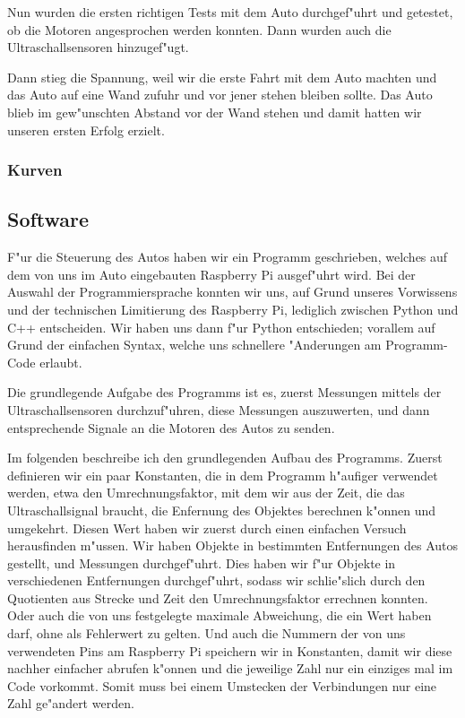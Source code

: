 \documentclass[a4paper,12pt]{article}
\begin{document}
Nun wurden die ersten richtigen Tests mit dem Auto durchgef"uhrt und getestet, ob die Motoren angesprochen werden konnten. Dann wurden auch die Ultraschallsensoren hinzugef"ugt.

Dann stieg die Spannung, weil wir die erste Fahrt mit dem Auto machten und das Auto auf eine Wand zufuhr und vor jener stehen bleiben sollte. Das Auto blieb im gew"unschten Abstand vor der Wand stehen und damit hatten wir unseren ersten Erfolg erzielt.

\subsubsection{Kurven}\label{sec2.1.6}

\subsection{Software}\label{sec2.2}

F"ur die Steuerung des Autos haben wir ein Programm geschrieben, welches auf dem von uns im Auto eingebauten Raspberry Pi ausgef"uhrt wird.
Bei der Auswahl der Programmiersprache konnten wir uns, auf Grund unseres Vorwissens und der technischen Limitierung des Raspberry Pi, lediglich zwischen Python und C++ entscheiden.
Wir haben uns dann f"ur Python entschieden; vorallem auf Grund der einfachen Syntax, welche uns schnellere "Anderungen am Programm-Code erlaubt.

Die grundlegende Aufgabe des Programms ist es, zuerst Messungen mittels der Ultraschallsensoren durchzuf"uhren, diese Messungen auszuwerten, und dann entsprechende Signale an die Motoren des Autos zu senden.

\medskip

Im folgenden beschreibe ich den grundlegenden Aufbau des Programms.
Zuerst definieren wir ein paar Konstanten, die in dem Programm h"aufiger verwendet werden, etwa den Umrechnungsfaktor, mit dem wir aus der Zeit, die das Ultraschallsignal braucht, die Enfernung des Objektes berechnen k"onnen und umgekehrt.
Diesen Wert haben wir zuerst durch einen einfachen Versuch herausfinden m"ussen.
Wir haben Objekte in bestimmten Entfernungen des Autos gestellt, und Messungen durchgef"uhrt.
Dies haben wir f"ur Objekte in verschiedenen Entfernungen durchgef"uhrt, sodass wir schlie"slich durch den Quotienten aus Strecke und Zeit den Umrechnungsfaktor errechnen konnten.
Oder auch die von uns festgelegte maximale Abweichung, die ein Wert haben darf, ohne als Fehlerwert zu gelten.
Und auch die Nummern der von uns verwendeten Pins am Raspberry Pi speichern wir in Konstanten, damit wir diese nachher einfacher abrufen k"onnen und die jeweilige Zahl nur ein einziges mal im Code vorkommt.
Somit muss bei einem Umstecken der Verbindungen nur eine Zahl ge"andert werden.
\end{document}
